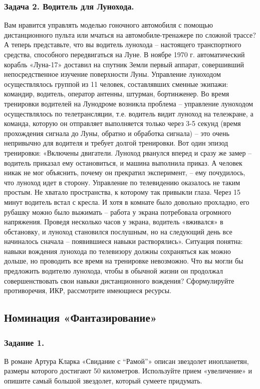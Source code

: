 \documentclass[11pt,a4paper]{article}
\begin{document}
\subsubsection*{Задача 2. Водитель для Лунохода.}
Вам нравится управлять моделью гоночного автомобиля с помощью дистанционного
пульта или мчаться на автомобиле-тренажере по сложной трассе? А теперь
представьте, что вы водитель лунохода – настоящего транспортного средства,
способного передвигаться на Луне. В ноябре 1970 г. автоматический корабль
«Луна-17» доставил на спутник Земли первый аппарат, совершивший
непосредственное изучение поверхности Луны. Управление луноходом
осуществлялось группой из 11 человек, составлявших сменные экипажи: командир,
водитель, оператор антенны, штурман, бортинженер. Во время тренировки
водителей на Лунодроме возникла проблема – управление луноходом осуществлялось
по телетрансляции, т.е. водитель видит луноход на телеэкране, а команда,
которую он отправляет выполняется только через 3-5 секунд (время прохождения
сигнала до Луны, обратно и обработка сигнала) – это очень непривычно для
водителя и требует долгой тренировки. Вот один эпизод тренировки: «Включены
двигатели. Луноход рванулся вперед и сразу же замер – водитель приказал ему
остановиться, и машина выполнила приказ. А человек никак не мог объяснить,
почему он прекратил эксперимент, – ему почудилось, что луноход идет в сторону.
Управление по телевидению оказалось не таким простым. Не хватало пространства,
к которому так привыкли глаза. Через 15 минут водитель встал с кресла. И хотя
в комнате было довольно прохладно, его рубашку можно было выжимать – работа у
экрана потребовала огромного напряжения. Проведя несколько часов у экрана,
водитель «вживался» в обстановку, и луноход становился послушным, но на
следующий день все начиналось сначала – появившиеся навыки растворялись».
Ситуация понятна: навыки вождения лунохода по телевизору должны сохраняться
как можно дольше, но проводить все время на тренировке невозможно. Что вы
могли бы предложить водителю лунохода, чтобы в обычной жизни он продолжал
совершенствовать свои навыки дистанционного вождения?  Сформулируйте
противоречия, ИКР, рассмотрите имеющиеся ресурсы.

\subsection{Номинация «Фантазирование»}

\subsubsection*{Задание 1.}
В романе Артура Кларка «Свидание с “Рамой”» описан звездолет инопланетян,
размеры которого достигают 50 километров. Используйте прием «увеличение» и
опишите самый большой звездолет, который сумеете придумать.
\end{document}
